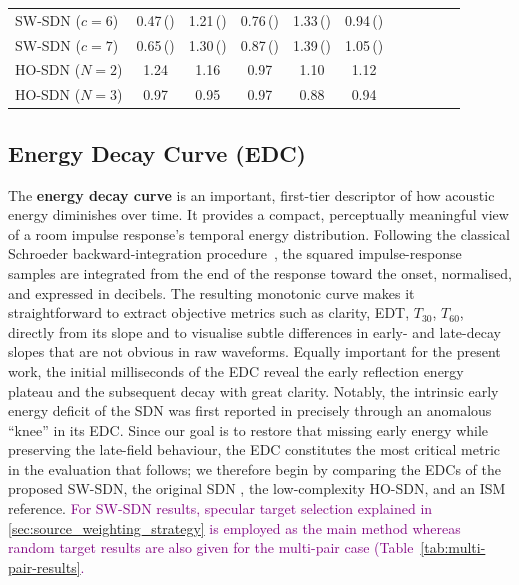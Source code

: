 \documentclass[journal]{IEEEtran}
\begin{document}
\begin{table}[tbh]
\begin{tabular}{l ccccc | ccccc}
        SW-SDN ($c=6$)
            & 0.47\,() & 1.21\,() & 0.76\,() & 1.33\,() & 0.94\,() 
            & & & & & \\
            
        SW-SDN ($c=7$)
            & 0.65\,() & 1.30\,() & 0.87\,() & 1.39\,() & 1.05\,() 
            & & & & & \\
        \midrule
        
        HO-SDN ($N=2$)
            & 1.24 & 1.16 & 0.97 & 1.10 & 1.12 
            & & & & & \\
            
        HO-SDN ($N=3$)
            & 0.97 & 0.95 & 0.97 & 0.88 & 0.94 
            & & & & & \\
        \bottomrule
    \end{tabular}
\end{table}

\subsection{Energy Decay Curve (EDC)}

The \textbf{energy decay curve} is an important, first-tier descriptor of how acoustic energy diminishes over time. It provides a compact, perceptually meaningful view of a room impulse response’s temporal energy distribution. 
Following the classical Schroeder backward-integration procedure~\cite{Schroeder1962}, the squared impulse-response samples are integrated from the end of the response toward the onset, normalised, and expressed in decibels. The resulting monotonic curve makes it straightforward to extract objective metrics such as clarity, EDT, $T_{30}$, $T_{60}$, directly from its slope and to visualise subtle differences in early- and late-decay slopes that are not obvious in raw waveforms.
Equally important for the present work, the initial milliseconds of the EDC reveal the early reflection energy plateau and the subsequent decay with great clarity.
Notably, the intrinsic early energy deficit of the SDN was first reported in \cite{SDNwaspaa} precisely through an anomalous “knee” in its EDC. Since our goal is to restore that missing early energy while preserving the late-field behaviour, the EDC constitutes the most critical metric in the evaluation that follows; we therefore begin by comparing the EDCs of the proposed SW-SDN, the original SDN \cite{SDNaes}, the low-complexity HO-SDN\cite{scerbo2022ho_sdn}, and an ISM reference. \textcolor{purple}{For SW-SDN results, specular target selection explained in \ref{sec:source_weighting_strategy} is employed as the main method whereas random target results are also given for the multi-pair case (Table~\ref{tab:multi-pair-results}.}
\end{document}
